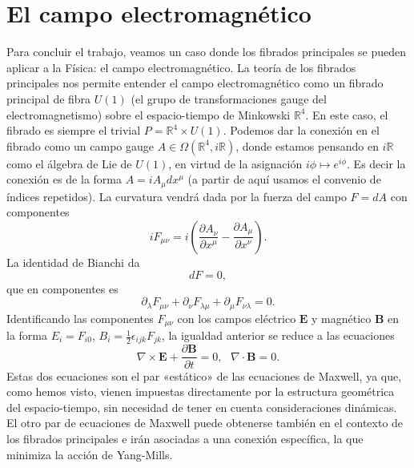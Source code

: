 \documentclass[12pt,a4paper]{article}
\theoremstyle{definition} \newtheorem{defn}[thm]{Definición}
\theoremstyle{definition} \newtheorem{ejemplo}[thm]{Ejemplo}
\theoremstyle{definition} \newtheorem{ejercicio}[thm]{Ejercicio}
\theoremstyle{remark} \newtheorem*{obs}{Observación}
\def\RR{\mathbb{R}}
\newcommand{\ve}[1]{\mathbf{#1}}
\begin{document}
	   \section{El campo electromagnético}
Para concluir el trabajo, veamos un caso donde los fibrados principales se pueden aplicar a la Física: el campo electromagnético. La teoría de los fibrados principales nos permite entender el campo electromagnético como un fibrado principal de fibra $U(1)$ (el grupo de transformaciones gauge del electromagnetismo) sobre el espacio-tiempo de Minkowski $\RR^4$. En este caso, el fibrado es siempre el trivial $P=\RR^4\times U(1)$. Podemos dar la conexión en el fibrado como un campo gauge $A\in \Omega(\RR^4,i\RR)$, donde estamos pensando en $i\RR$ como el álgebra de Lie de $U(1)$, en virtud de la asignación $i\phi \mapsto e^{i\phi}$. Es decir la conexión es de la forma $A=iA_{\mu}dx^{\mu}$ (a partir de aquí usamos el convenio de índices repetidos). La curvatura vendrá dada por la fuerza del campo $F=dA$ con componentes
	   \begin{equation*}
	     iF_{\mu\nu}=i\left( \frac{\partial A_\nu}{\partial x^\mu}-\frac{\partial A_\mu}{\partial x^\nu} \right).
	   \end{equation*}
	   La identidad de Bianchi da
	   \begin{equation*}
	     dF=0,
	   \end{equation*}
	   que en componentes es
	   \begin{equation*}
	     \partial_\lambda F_{\mu\nu}+\partial_\nu F_{\lambda\mu}+\partial_\mu F_{\nu\lambda}=0.
	   \end{equation*}
	   Identificando las componentes $F_{\mu\nu}$ con los campos eléctrico $\ve{E}$ y magnético $\ve{B}$ en la forma $E_i=F_{i0}$, $B_i=\frac{1}{2}\epsilon_{ijk}F_{jk}$, la igualdad anterior se reduce a las ecuaciones
	   \begin{equation*}
	     \nabla \times \ve{E}+ \frac{\partial \ve{B}}{\partial t}=0,\  \ \ \nabla \cdot \ve{B}=0.
	   \end{equation*}
	   Estas dos ecuaciones son el par «estático» de las ecuaciones de Maxwell, ya que, como hemos visto, vienen impuestas directamente por la estructura geométrica del espacio-tiempo, sin necesidad de tener en cuenta consideraciones dinámicas. El otro par de ecuaciones de Maxwell puede obtenerse también en el contexto de los fibrados principales e irán asociadas a una conexión específica, la que minimiza la acción de Yang-Mills.
\end{document}
